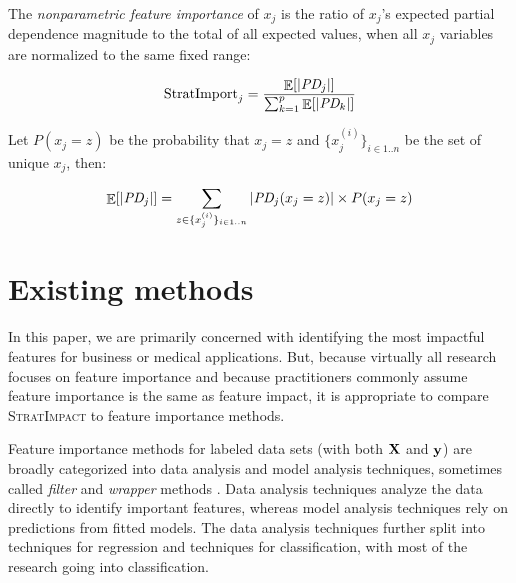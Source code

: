 \documentclass[11pt]{article}
\newcommand{\eqnref}[1]{Equation~\ref{#1}}
\newcommand{\cut}[1]{}
\DeclareMathOperator{\Ex}{\mathbb{E}}
\newcommand{\Impo}{\text{StratImport}}
\newcommand{\simp}{\fontfamily{cmr}\textsc{\small StratImpact}}
\begin{document}
\cut{
While feature importances should not be interpreted as feature impacts, impacts can be effective as feature importances for model feature selection.  Features with the most impact on the response variable the most should coincide with the most predictive features. But, m

The definition of impact in \eqnref{eq:Epd2a} assumes that each $x_j$ value is equally likely, which is not the case in practice for $(\bf X, y)$ data sets. To go from partial dependence to importance, the $\text{\it PD}_j$ curve at $x_j=z$ must be weighted by the number of samples at $x_j=z$ before computing the average magnitude.}

~\\
 The {\em nonparametric feature importance} of $x_j$ is the ratio of $x_j$'s expected partial dependence magnitude to the total of all expected values, when all $x_j$ variables are normalized to the same fixed range:

\begin{equation}\label{eq:Epd2b}
\Impo_j = \frac{\Ex[|\text{\it PD}_j|]}{\sum_{k=1}^p \Ex[|\text{\it PD}_k|]}
\end{equation}

\noindent Let $P(x_j = z)$ be the probability that $x_j=z$ and $\{x_j^{(i)}\}_{i \in 1..n}$ be the set of unique $x_j$, then:


\begin{equation}\label{eq:Epd2c}
\Ex[|\text{\it PD}_j|] = \sum_{z \in \{x_j^{(i)}\}_{i \in 1..n}} |\text{\it PD}_j(x_j = z)| \times P(x_j=z)
\end{equation}

\section{Existing methods}\label{sec:existing}

In this paper, we are primarily concerned with identifying the most impactful features for business or medical applications. But, because virtually all research focuses on feature importance and because practitioners commonly assume feature importance is the same as feature impact, it is appropriate to compare \simp{} to  feature importance methods.

Feature importance methods for labeled data sets (with both $\bf X$ and $\bf y$) are broadly categorized into data analysis and model analysis techniques, sometimes called {\em filter} and {\em wrapper} methods \citep{tsanas}. Data analysis techniques analyze the data directly to identify important features, whereas model analysis techniques rely on predictions from fitted models.  The data analysis techniques further split into techniques for regression and techniques for classification, with most of the research going into classification.
\end{document}
